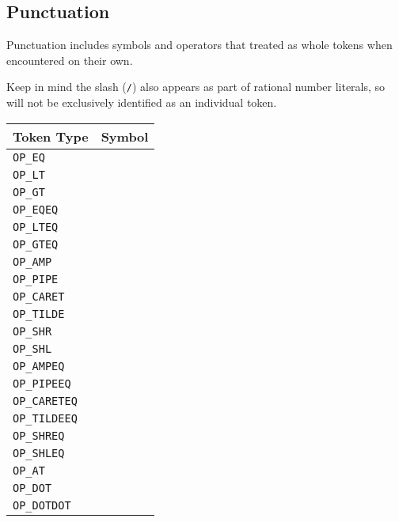 \subsection{Punctuation}

Punctuation includes symbols and operators that treated as whole tokens when encountered
on their own.

Keep in mind the slash (\texttt{/}) also appears as part of rational number literals, so
will not be exclusively identified as an individual token.

\begin{table}[H]
\parbox[t]{0.45\linewidth}{
    \centering
    \begin{tabular}[t]{|ll|}
        \hline
        \textbf{Token Type} & \textbf{Symbol} \\
        \hline
        \texttt{OP\_EQ} & \op{=} \\
        \texttt{OP\_LT} & \op{<} \\
        \texttt{OP\_GT} & \op{>} \\
        \texttt{OP\_EQEQ} & \op{==} \\
        \texttt{OP\_LTEQ} & \op{<=} \\
        \texttt{OP\_GTEQ} & \op{>=} \\
        \hline
        \texttt{OP\_AMP} & \op{\&} \\
        \texttt{OP\_PIPE} & \op{|} \\
        \texttt{OP\_CARET} & \op{\textasciicircum} \\
        \texttt{OP\_TILDE} & \op{\textasciitilde} \\
        \texttt{OP\_SHR} & \op{\textasciitilde>} \\
        \texttt{OP\_SHL} & \op{<\textasciitilde} \\
        \hline
        \texttt{OP\_AMPEQ} & \op{\&=} \\
        \texttt{OP\_PIPEEQ} & \op{|=} \\
        \texttt{OP\_CARETEQ} & \op{\textasciicircum=} \\
        \texttt{OP\_TILDEEQ} & \op{\textasciitilde=} \\
        \texttt{OP\_SHREQ} & \op{\textasciitilde>=} \\
        \texttt{OP\_SHLEQ} & \op{<\textasciitilde=} \\
        \hline
        \texttt{OP\_AT} & \op{@} \\
        \texttt{OP\_DOT} & \op{.} \\
        \texttt{OP\_DOTDOT} & \op{..} \\

\end{tabular}}
\end{table}

